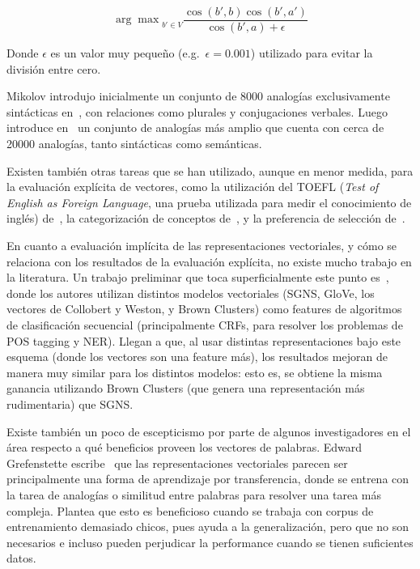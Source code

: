 \[
  {\arg \max}_{b' \in V} \frac{\cos(b', b) \cos(b', a')}{\cos(b', a) + \epsilon}
\]

Donde $\epsilon$ es un valor muy pequeño (e.g.\ $\epsilon = 0.001$) utilizado para evitar la
división entre cero.

Mikolov introdujo inicialmente un conjunto de 8000 analogías exclusivamente sintácticas
en~\cite{Mikolov2013a}, con relaciones como plurales y conjugaciones verbales. Luego introduce
en~\cite{Mikolov2013b} un conjunto de analogías más amplio que cuenta con cerca de 20000 analogías,
tanto sintácticas como semánticas.

Existen también otras tareas que se han utilizado, aunque en menor medida, para la evaluación
explícita de vectores, como la utilización del TOEFL (\textit{Test of English as Foreign Language},
una prueba utilizada para medir el conocimiento de inglés) de~\cite{LandauerDumais1997}, la
categorización de conceptos de~\cite{Almuhareb2006}, y la preferencia de selección
de~\cite{Pado2007}.


En cuanto a evaluación implícita de las representaciones vectoriales, y cómo se relaciona con los
resultados de la evaluación explícita, no existe mucho trabajo en la literatura. Un trabajo
preliminar que toca superficialmente este punto es~\cite{Qu2015}, donde los autores utilizan
distintos modelos vectoriales (SGNS, GloVe, los vectores de Collobert y Weston, y Brown Clusters)
como features de algoritmos de clasificación secuencial (principalmente CRFs, para resolver los
problemas de POS tagging y NER). Llegan a que, al usar distintas representaciones bajo este esquema
(donde los vectores son una feature más), los resultados mejoran de manera muy similar para los
distintos modelos: esto es, se obtiene la misma ganancia utilizando Brown Clusters (que genera una
representación más rudimentaria) que SGNS\@.

Existe también un poco de escepticismo por parte de algunos investigadores en el área respecto a qué
beneficios proveen los vectores de palabras. Edward Grefenstette escribe~\cite{Reddit2016} que las
representaciones vectoriales parecen ser principalmente una forma de aprendizaje por transferencia,
donde se entrena con la tarea de analogías o similitud entre palabras para resolver una tarea más
compleja. Plantea que esto es beneficioso cuando se trabaja con corpus de entrenamiento demasiado
chicos, pues ayuda a la generalización, pero que no son necesarios e incluso pueden perjudicar la
performance cuando se tienen suficientes datos.

